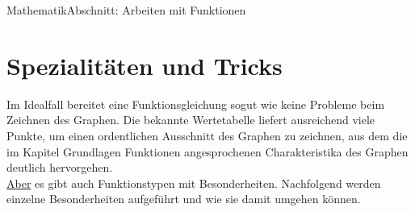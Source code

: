 \documentclass[11pt,twocolumn,oneside,openany,headings=optiontotoc,11pt,numbers=noenddot]{article}
\begin{document}
	\begin{worksheet}{}{Mathematik}{Abschnitt: Arbeiten mit Funktionen}
		\setcounter{section}{5}
		\setcounter{page}{14}
		\section{Spezialitäten und Tricks}
		Im Idealfall bereitet eine Funktionsgleichung sogut wie keine Probleme beim Zeichnen des Graphen. Die bekannte Wertetabelle liefert ausreichend viele Punkte, um einen ordentlichen Ausschnitt des Graphen zu zeichnen, aus dem die im Kapitel \glqq{}Grundlagen Funktionen\grqq{} angesprochenen Charakteristika des Graphen deutlich hervorgehen.\\
		\underline{Aber} es gibt auch Funktionstypen mit Besonderheiten. Nachfolgend werden einzelne Besonderheiten aufgeführt und wie sie damit umgehen können.

\end{worksheet}
\end{document}
